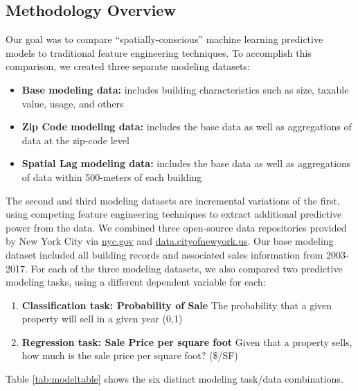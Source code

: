 \documentclass[12pt,]{article}
\providecommand{\tightlist}{%
  \setlength{\itemsep}{0pt}\setlength{\parskip}{0pt}}
\begin{document}
\hypertarget{methodology-overview}{%
\subsection{Methodology Overview}\label{methodology-overview}}

Our goal was to compare ``spatially-conscious'' machine learning
predictive models to traditional feature engineering techniques. To
accomplish this comparison, we created three separate modeling datasets:

\begin{itemize}
\tightlist
\item
  \textbf{Base modeling data:} includes building characteristics such as
  size, taxable value, usage, and others
\item
  \textbf{Zip Code modeling data:} includes the base data as well as
  aggregations of data at the zip-code level
\item
  \textbf{Spatial Lag modeling data:} includes the base data as well as
  aggregations of data within 500-meters of each building
\end{itemize}

\noindent The second and third modeling datasets are incremental
variations of the first, using competing feature engineering techniques
to extract additional predictive power from the data. We combined three
open-source data repositories provided by New York City via
\url{nyc.gov} and \url{data.cityofnewyork.us}. Our base modeling dataset
included all building records and associated sales information from
2003-2017. For each of the three modeling datasets, we also compared two
predictive modeling tasks, using a different dependent variable for
each:

\begin{enumerate}
\def\labelenumi{\arabic{enumi})}
\tightlist
\item
  \textbf{Classification task: Probability of Sale} The probability that
  a given property will sell in a given year (0,1)
\item
  \textbf{Regression task: Sale Price per square foot} Given that a
  property sells, how much is the sale price per square foot? (\$/SF)
\end{enumerate}

\noindent Table \ref{tab:modeltable} shows the six distinct modeling
task/data combinations.
\end{document}
